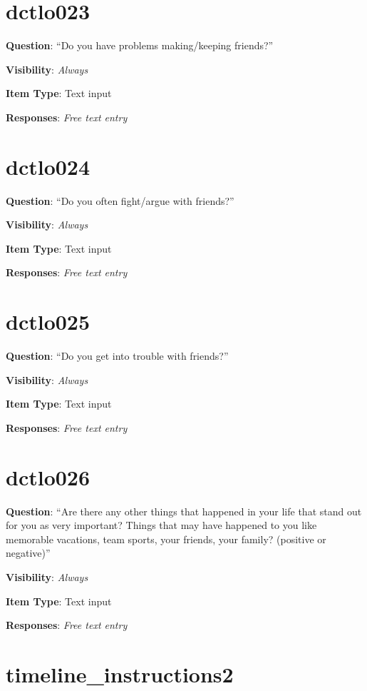 \documentclass[]{book}
\begin{document}
\hypertarget{dctlo023}{%
\section{dctlo023}\label{dctlo023}}

\textbf{Question}: ``Do you have problems making/keeping friends?''

\textbf{Visibility}: \emph{Always}

\textbf{Item Type}: Text input

\textbf{Responses}: \emph{Free text entry}

\hypertarget{dctlo024}{%
\section{dctlo024}\label{dctlo024}}

\textbf{Question}: ``Do you often fight/argue with friends?''

\textbf{Visibility}: \emph{Always}

\textbf{Item Type}: Text input

\textbf{Responses}: \emph{Free text entry}

\hypertarget{dctlo025}{%
\section{dctlo025}\label{dctlo025}}

\textbf{Question}: ``Do you get into trouble with friends?''

\textbf{Visibility}: \emph{Always}

\textbf{Item Type}: Text input

\textbf{Responses}: \emph{Free text entry}

\hypertarget{dctlo026}{%
\section{dctlo026}\label{dctlo026}}

\textbf{Question}: ``Are there any other things that happened in your life that stand out for you as very important? Things that may have happened to you like memorable vacations, team sports, your friends, your family? (positive or negative)''

\textbf{Visibility}: \emph{Always}

\textbf{Item Type}: Text input

\textbf{Responses}: \emph{Free text entry}

\hypertarget{timeline_instructions2}{%
\section{timeline\_instructions2}\label{timeline_instructions2}}
\end{document}
